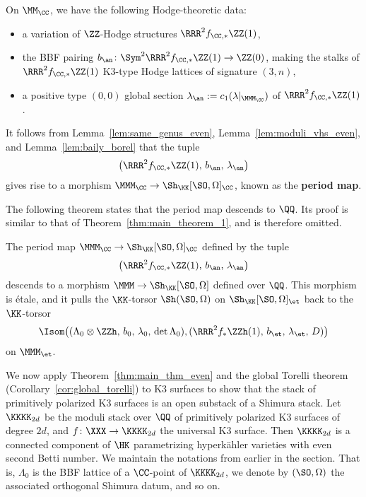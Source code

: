 On $\MM_{\CC}$, we have the following Hodge-theoretic data:
\begin{itemize}
\item a variation of $\ZZ$-Hodge structures $\RRR^2 f_{\CC,*} \ZZ(1)$,
\item the BBF pairing $b_{\an}\colon \Sym^2 \RRR^2 f_{\CC,*} \ZZ(1) \rightarrow \ZZ(0)$, making the stalks of $\RRR^2 f_{\CC,*} \ZZ(1)$ K3-type Hodge lattices of signature $(3,n)$,
\item a positive type $(0,0)$ global section $\lambda_{\an} := c_1(\lambda|_{\MMM_{\CC}})$ of $\RRR^2 f_{\CC,*}\ZZ(1)$.
\end{itemize}
It follows from Lemma~\ref{lem:same_genus_even}, Lemma~\ref{lem:moduli_vhs_even}, and Lemma~\ref{lem:baily_borel} that the tuple
$$
\left(\RRR^2 f_{\CC,*}\ZZ(1),\, b_{\an},\, \lambda_{\an}\right)
$$
gives rise to a morphism $\MMM_{\CC} \rightarrow \Sh_{\KK}[\SO,\Omega]_{\CC}$, known as the {\bfseries period map}. 

The following theorem states that the period map descends to $\QQ$. Its proof is similar to that of Theorem~\ref{thm:main_theorem_1}, and is therefore omitted.
\begin{theorem}\label{thm:main_thm_even}
The period map $\MMM_{\CC} \rightarrow \Sh_{\KK}[\SO,\Omega]_{\CC}$ defined by the tuple 
$$
\left(\RRR^2 f_{\CC,*} \ZZ(1),\, b_{\an},\, \lambda_{\an}\right)
$$
descends to a morphism $\MMM \rightarrow \Sh_{\KK}[\SO,\Omega]$ defined over $\QQ$. This morphism is \'etale, and it pulls the $\KK$-torsor $\Sh(\SO,\Omega)$ on $\Sh_{\KK}[\SO,\Omega]_{\et}$ back to the $\KK$-torsor
$$
\Isom\!\left((\Lambda_0 \otimes \ZZh,\, b_0,\, \lambda_0,\, \det \Lambda_0), (\RRR^2 f_* \ZZh(1),\, b_{\et},\, \lambda_{\et},\, D)\right)
$$
on $\MMM_{\et}$.
\end{theorem}

We now apply Theorem~\ref{thm:main_thm_even} and the global Torelli theorem (Corollary~\ref{cor:global_torelli}) to K3 surfaces to show that the stack of primitively polarized K3 surfaces is an open substack of a Shimura stack. Let $\KKKK_{2d}$ be the moduli stack over $\QQ$ of primitively polarized K3 surfaces of degree $2d$, and $f\colon \XXX \rightarrow \KKKK_{2d}$ the universal K3 surface. Then $\KKKK_{2d}$ is a connected component of $\HK$ parametrizing hyperk\"ahler varieties with even second Betti number. We maintain the notations from earlier in the section. That is, $\Lambda_0$ is the BBF lattice of a $\CC$-point of $\KKKK_{2d}$, we denote by $(\SO,\Omega)$ the associated orthogonal Shimura datum, and so on.

